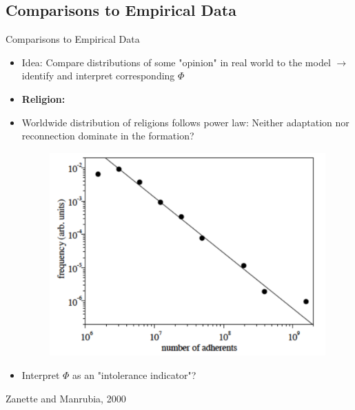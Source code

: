 \documentclass[xcolor=x11names,compress]{beamer}
\renewcommand{\(}{\begin{columns}}
\renewcommand{\)}{\end{columns}}
\newcommand{\<}[1]{\begin{column}{#1}}
\renewcommand{\>}{\end{column}}
\begin{document}
\subsection{Comparisons to Empirical Data}
\begin{frame}{Comparisons to Empirical Data}

\begin{itemize}

\item Idea: Compare distributions of some "opinion" in real world to the model $\rightarrow$ identify and interpret corresponding $\Phi$

\vspace{0.1in}

\item \textbf{Religion:}
\item Worldwide distribution of religions follows power law: Neither adaptation nor reconnection dominate in the formation?




\begin{figure}
    \includegraphics[scale=0.25]{Graphics/religion_power_law.pdf}
\end{figure}

\item Interpret $\Phi$ as an "intolerance indicator"?

\end{itemize}

\begin{tiny}
Zanette and Manrubia, 2000 \cite{religion power law}
\end{tiny}

\end{frame}
\end{document}
